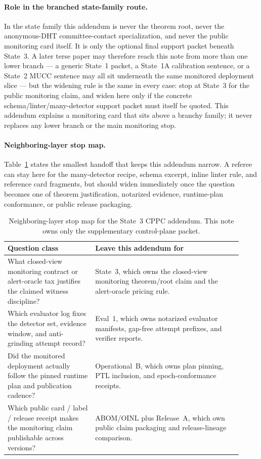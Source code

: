 \documentclass[11pt]{article}
\theoremstyle{definition}
\theoremstyle{remark}
\begin{document}
\paragraph{Role in the branched state-family route.}
In the state family this addendum is never the theorem root, never the anonymous-DHT committee-contact specialization, and never the public monitoring card itself.  It is only the optional final support packet beneath State~3.  A later terse paper may therefore reach this note from more than one lower branch --- a generic State~1 packet, a State~1A calibration sentence, or a State~2 MUCC sentence may all sit underneath the same monitored deployment slice --- but the widening rule is the same in every case: stop at State~3 for the public monitoring claim, and widen here only if the concrete schema/linter/many-detector support packet must itself be quoted.  This addendum explains a monitoring card that sits above a branchy family; it never replaces any lower branch or the main monitoring stop.\cite{series:state1,series:state1addendum,series:state2,series:state3}

\paragraph{Neighboring-layer stop map.}
Table~\ref{tab:cppc-addendum-stopmap} states the smallest handoff that keeps this addendum narrow.
A referee can stay here for the many-detector recipe, schema excerpt, inline linter rule, and reference card fragments, but should widen immediately once the question becomes one of theorem justification, notarized evidence, runtime-plan conformance, or public release packaging.

\begin{table}[H]
\centering
\begin{tabular}{@{}p{0.34\linewidth}p{0.58\linewidth}@{}}
\toprule
Question class & Leave this addendum for \\
\midrule
What closed-view monitoring contract or alert-oracle tax justifies the claimed witness discipline? & State~3, which owns the closed-view monitoring theorem/root claim and the alert-oracle pricing rule. \\
Which evaluator log fixes the detector set, evidence window, and anti-grinding attempt record? & Eval~1, which owns notarized evaluator manifests, gap-free attempt prefixes, and verifier reports. \\
Did the monitored deployment actually follow the pinned runtime plan and publication cadence? & Operational~B, which owns plan pinning, PTL inclusion, and epoch-conformance receipts. \\
Which public card / label / release receipt makes the monitoring claim publishable across versions? & ABOM/OINL plus Release~A, which own public claim packaging and release-lineage comparison. \\
\bottomrule
\end{tabular}
\caption{Neighboring-layer stop map for the State~3 CPPC addendum. This note owns only the supplementary control-plane packet.}
\label{tab:cppc-addendum-stopmap}
\end{table}
\end{document}
